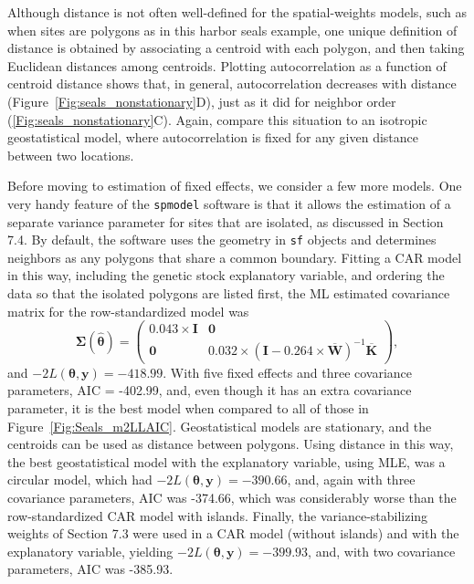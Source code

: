 \documentclass[12pt, titlepage]{article}
\begin{document}
Although distance is not often well-defined for the spatial-weights models, such as when sites are polygons as in this harbor seals example, one unique definition of distance is obtained by associating a centroid with each polygon, and then taking Euclidean distances among centroids.  Plotting autocorrelation as a function of centroid distance shows that, in general, autocorrelation decreases with distance (Figure~\ref{Fig:seals_nonstationary}D), just as it did for neighbor order (\ref{Fig:seals_nonstationary}C).  Again, compare this situation to an isotropic geostatistical model, where autocorrelation is fixed for any given distance between two locations.

Before moving to estimation of fixed effects, we consider a few more models.  One very handy feature of the \texttt{spmodel} software is that it allows the estimation of a separate variance parameter for sites that are isolated, as discussed in Section 7.4.  By default, the software uses the geometry in \texttt{sf} objects and determines neighbors as any polygons that share a common boundary.  Fitting a CAR model in this way, including the genetic stock explanatory variable, and ordering the data so that the isolated polygons are listed first, the ML estimated covariance matrix for the row-standardized model was
$$
\boldsymbol{\Sigma}(\hat{\boldsymbol{\theta}}) = \left({}
	\begin{array}{cc}
	  0.043\times\mathbf{I} & \mathbf{0} \\
	  \mathbf{0} & 0.032\times(\mathbf{I} - 0.264\times\overline{\mathbf{W}})^{-1}\overline{\mathbf{K}}
	\end{array}
\right),
$$
and $-2L(\boldsymbol{\theta},\mathbf{y}) = -418.99$.  With five fixed effects and three covariance parameters, AIC = -402.99, and, even though it has an extra covariance parameter, it is the best model when compared to all of those in Figure~\ref{Fig:Seals_m2LLAIC}.  Geostatistical models are stationary, and the centroids can be used as distance between polygons.  Using distance in this way, the best geostatistical model with the explanatory variable, using MLE, was a circular model, which had $-2L(\boldsymbol{\theta},\mathbf{y}) = -390.66$, and, again with three covariance parameters, AIC was -374.66, which was considerably worse than the row-standardized CAR model with islands.  Finally, the variance-stabilizing weights of Section 7.3 were used in a CAR model (without islands) and with the explanatory variable, yielding $-2L(\boldsymbol{\theta},\mathbf{y}) = -399.93$, and, with two covariance parameters, AIC was -385.93.
\end{document}
